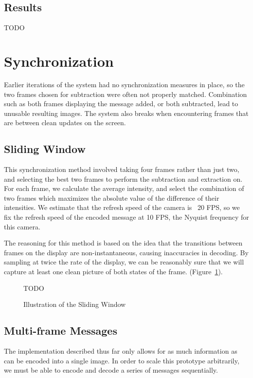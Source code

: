 \documentclass[11pt, letterpaper]{article}
\begin{document}
\subsection{Results}
TODO

\section{Synchronization}
Earlier iterations of the system had no synchronization measures in place, so the two frames chosen for subtraction were often not properly matched.
Combination such as both frames displaying the message added, or both subtracted, lead to unusable resulting images.
The system also breaks when encountering frames that are between clean updates on the screen.

\subsection{Sliding Window}
This synchronization method involved taking four frames rather than just two, and selecting the best two frames to perform the subtraction and extraction on.
For each frame, we calculate the average intensity, and select the combination of two frames which maximizes the absolute value of the difference of their intensities.
We estimate that the refresh speed of the camera is ~20 FPS, so we fix the refresh speed of the encoded message at 10 FPS, the Nyquist frequency for this camera.

The reasoning for this method is based on the idea that the transitions between frames on the display are non-instantaneous, causing inaccuracies in decoding.
By sampling at twice the rate of the display, we can be reasonably sure that we will capture at least one clean picture of both states of the frame. (Figure~\ref{fig:slidingwindow}).

\begin{figure}[slidingwindow]
  \centering
  TODO
  \caption{Illustration of the Sliding Window}
  \label{fig:slidingwindow}
\end{figure}


\subsection{Multi-frame Messages}
The implementation described thus far only allows for as much information as can be encoded into a single image.
In order to scale this prototype arbitrarily, we must be able to encode and decode a series of messages sequentially.
\end{document}

